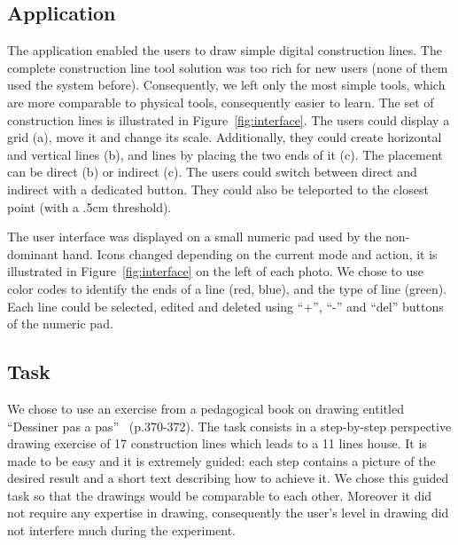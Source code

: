 \documentclass{sigchi}
\begin{document}
\subsection{Application}

  The application enabled the users to draw simple digital construction
  lines. The complete construction line tool solution was too rich for
  new users (none of them used the system before). 
  Consequently, we left only the most simple tools, which are more
  comparable to physical tools, consequently easier to learn. 
  The set of construction lines is illustrated in
  Figure~\ref{fig:interface}. 
  The users could display a grid (a),
  move it and change its scale. Additionally, they could create 
  horizontal and vertical lines (b), and lines by placing the two ends
  of it (c). The placement can be direct (b) or indirect (c). The
  users could switch between direct and indirect with a dedicated
  button. They could also be teleported to the closest point (with a
  .5cm threshold). 

  The user interface was displayed on a small numeric pad used by the
  non-dominant hand. Icons changed depending on the current mode and
  action, it is illustrated in Figure~\ref{fig:interface} on the left
  of each photo. We chose to
  use color codes to identify the ends of a line (red, blue), and the
  type of line (green).  Each line could be selected, edited and
  deleted using ``+'', ``-'' and ``del'' buttons of the numeric pad.


     


\subsection{Task}

   We chose to use an exercise from a pedagogical book on drawing
   entitled ``Dessiner pas a pas''~\cite{dessiner-ronin}
   (p.370-372). The task consists in a 
   step-by-step perspective drawing exercise of 17 construction lines
   which leads to a 11 lines house. It is made to be easy and it is
   extremely guided:
   each step contains a picture of the desired result and a short text
   describing how to achieve it. 
   We chose this guided task so that the drawings would be comparable
   to each other. Moreover it did not require any expertise in
   drawing, consequently the user's level in drawing did not interfere
   much during the experiment. 
\end{document}
